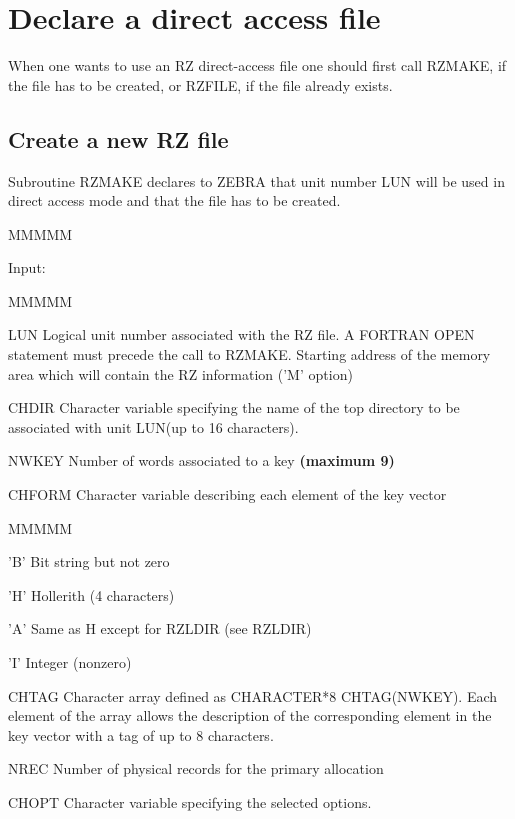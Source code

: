 \section{Declare a direct access file}
\par When one wants to use an RZ
direct-access file one should first call RZMAKE, if the file has to be
created, or RZFILE, if the file already exists.
\subsection{Create a new RZ file}
\par Subroutine RZMAKE declares to ZEBRA that unit number
LUN will be used in direct access mode and that the file has to be
created.
\begin{DL}{MMMMM}
\item[Input:
]
\begin{DL}{MMMMM}
\item[LUN
]Logical unit number associated with the RZ file.
A FORTRAN OPEN statement must precede the call to RZMAKE.
\newline Starting address of the memory area which will contain the
RZ information ('M' option)
\item[CHDIR
]Character variable specifying the name of the top directory to be
associated with unit LUN(up to 16 characters).
\item[NWKEY
]Number of words associated to a key {\bf (maximum 9)}
\item[CHFORM
]Character variable describing each element of the key vector
\begin{DL}{MMMMM}
\item['B'
]Bit string but not zero
\item['H'
]Hollerith (4 characters)
\item['A'
]Same as H except for RZLDIR (see RZLDIR)
\item['I'
]Integer (nonzero)
\end{DL}
\item[CHTAG
]Character array defined as CHARACTER*8 CHTAG(NWKEY).
\newline
Each element of the array allows the description of the corresponding
element in the key vector with a tag of up to 8 characters.
\item[NREC
]Number of physical records for the primary allocation
\item[CHOPT
]Character variable specifying the selected options.

\end{DL}
\end{DL}
